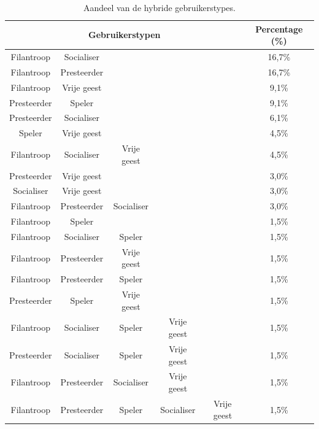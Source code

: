 \begin{table}
    \begin{center}
        \begin{tabular}{c|c|c|c|c|c}
            \multicolumn{5}{c|}{\textbf{Gebruikerstypen}} & \textbf{Percentage} (\%)\\
            \hline
            Filantroop & Socialiser & & & & 16,7\% \\
            \hline
            Filantroop & Presteerder & & & & 16,7\%\\
            \hline
            Filantroop & Vrije geest & & & & 9,1\%\\
            \hline
            Presteerder & Speler & & & & 9,1\%\\
            \hline
            Presteerder & Socialiser & & & & 6,1\%\\
            \hline
            Speler & Vrije geest & & & & 4,5\%\\
            \hline
            Filantroop & Socialiser & Vrije geest & & & 4,5\%\\
            \hline
            Presteerder & Vrije geest & & & & 3,0\%\\
            \hline
            Socialiser & Vrije geest & & & & 3,0\%\\
            \hline
            Filantroop & Presteerder & Socialiser & & & 3,0\%\\
            \hline
            Filantroop & Speler & & & & 1,5\%\\
            \hline
            Filantroop & Socialiser & Speler & & & 1,5\%\\
            \hline
            Filantroop & Presteerder & Vrije geest & & & 1,5\%\\
            \hline
            Filantroop & Presteerder & Speler & & & 1,5\%\\
            \hline
            Presteerder & Speler & Vrije geest & & & 1,5\%\\
            \hline
            Filantroop & Socialiser & Speler & Vrije geest & & 1,5\%\\
            \hline
            Presteerder & Socialiser & Speler & Vrije geest & & 1,5\%\\
            \hline
            Filantroop & Presteerder & Socialiser & Vrije geest & & 1,5\%\\
            \hline
            Filantroop & Presteerder & Speler & Socialiser & Vrije geest & 1,5\%\\
        \end{tabular}
    \end{center}
    \caption{Aandeel van de hybride gebruikerstypes.}
    \label{tab:aandeelhybridetypes}
\end{table}

